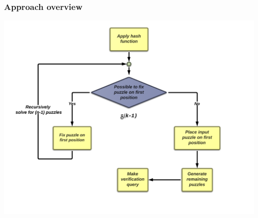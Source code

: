 \documentclass[first,firstsupp, last]{ETHclass}
\begin{document}
\begin{frame}[t]
  \frametitle{Approach overview}
  \centering
  \includegraphics[scale=0.3]{images/AlgoBlock1.pdf}
\end{frame}
\end{document}
